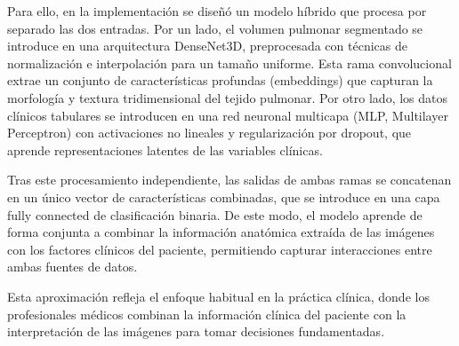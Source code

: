 Para ello, en la implementación se diseñó un modelo híbrido que procesa por separado las dos entradas. Por un lado, el volumen pulmonar segmentado se introduce en una arquitectura DenseNet3D, preprocesada con técnicas de normalización e interpolación para un tamaño uniforme. Esta rama convolucional extrae un conjunto de características profundas (embeddings) que capturan la morfología y textura tridimensional del tejido pulmonar. Por otro lado, los datos clínicos tabulares se introducen en una red neuronal multicapa (MLP, Multilayer Perceptron) con activaciones no lineales y regularización por dropout, que aprende representaciones latentes de las variables clínicas.  

Tras este procesamiento independiente, las salidas de ambas ramas se concatenan en un único vector de características combinadas, que se introduce en una capa fully connected de clasificación binaria. De este modo, el modelo aprende de forma conjunta a combinar la información anatómica extraída de las imágenes con los factores clínicos del paciente, permitiendo capturar interacciones entre ambas fuentes de datos.  

Esta aproximación refleja el enfoque habitual en la práctica clínica, donde los profesionales médicos combinan la información clínica del paciente con la interpretación de las imágenes para tomar decisiones fundamentadas.


\endinput
